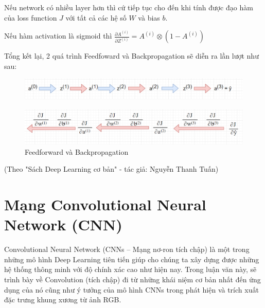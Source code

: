 Nếu network có nhiều layer hơn thì cứ tiếp tục cho đến khi tính được đạo hàm của loss function $J$ với tất cả các hệ số $W$ và bias $b$.

Nếu hàm activation là sigmoid thì $\frac{\partial A^{(i)}}{\partial Z^{(i)}} = A^{(i)} \otimes (1-A^{(i)})$

Tổng kết lại, 2 quá trình Feedfoward và Backpropagation sẽ diễn ra lần lượt như sau:

\FloatBarrier
\begin{figure}[htp]
\begin{center}
\includegraphics[scale=0.7]{chap2/c2_figs/7.png}
\end{center}
\end{figure}
\FloatBarrier

\FloatBarrier
\begin{figure}[htp]
\begin{center}
\includegraphics[scale=0.65]{chap2/c2_figs/8.png}
\end{center}
\caption{Feedforward và Backpropagation}
\label{fig:backpropagation}
\end{figure}
\FloatBarrier

(Theo "Sách Deep Learning cơ bản" - tác giả: Nguyễn Thanh Tuấn)

\section{Mạng Convolutional Neural Network (CNN)}
Convolutional Neural Network (CNNs – Mạng nơ-ron tích chập) là một trong những mô hình Deep Learning tiên tiến giúp cho chúng ta xây dựng được những hệ thống thông minh với độ chính xác cao như hiện nay. Trong luận văn này, sẽ trình bày về Convolution (tích chập) đi từ những khái niệm cơ bản nhất đến ứng dụng của nó cũng như ý tưởng của mô hình CNNs trong phát hiện và trích xuất đặc trưng khung xương từ ảnh RGB.

